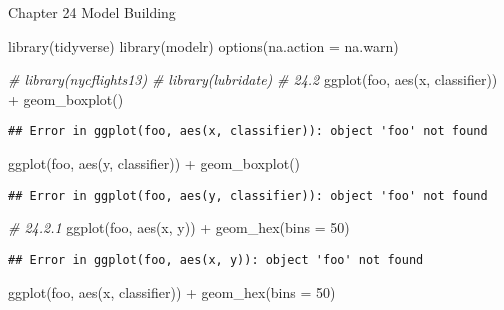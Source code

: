 \documentclass[
]{article}
\newenvironment{Shaded}{\begin{snugshade}}{\end{snugshade}}
\newcommand{\AttributeTok}[1]{\textcolor[rgb]{0.77,0.63,0.00}{#1}}
\newcommand{\CommentTok}[1]{\textcolor[rgb]{0.56,0.35,0.01}{\textit{#1}}}
\newcommand{\DecValTok}[1]{\textcolor[rgb]{0.00,0.00,0.81}{#1}}
\newcommand{\FunctionTok}[1]{\textcolor[rgb]{0.00,0.00,0.00}{#1}}
\newcommand{\NormalTok}[1]{#1}
\newcommand{\SpecialCharTok}[1]{\textcolor[rgb]{0.00,0.00,0.00}{#1}}
\begin{document}
Chapter 24 Model Building

\begin{Shaded}
\begin{Highlighting}[]
\FunctionTok{library}\NormalTok{(tidyverse)}
\FunctionTok{library}\NormalTok{(modelr)}
\FunctionTok{options}\NormalTok{(}\AttributeTok{na.action =}\NormalTok{ na.warn)}

\CommentTok{\# library(nycflights13)}
\CommentTok{\# library(lubridate)}
\CommentTok{\# 24.2}
\FunctionTok{ggplot}\NormalTok{(foo, }\FunctionTok{aes}\NormalTok{(x, classifier)) }\SpecialCharTok{+} \FunctionTok{geom\_boxplot}\NormalTok{()}
\end{Highlighting}
\end{Shaded}

\begin{verbatim}
## Error in ggplot(foo, aes(x, classifier)): object 'foo' not found
\end{verbatim}

\begin{Shaded}
\begin{Highlighting}[]
\FunctionTok{ggplot}\NormalTok{(foo, }\FunctionTok{aes}\NormalTok{(y, classifier)) }\SpecialCharTok{+} \FunctionTok{geom\_boxplot}\NormalTok{()}
\end{Highlighting}
\end{Shaded}

\begin{verbatim}
## Error in ggplot(foo, aes(y, classifier)): object 'foo' not found
\end{verbatim}

\begin{Shaded}
\begin{Highlighting}[]
\CommentTok{\# 24.2.1}
\FunctionTok{ggplot}\NormalTok{(foo, }\FunctionTok{aes}\NormalTok{(x, y)) }\SpecialCharTok{+} 
  \FunctionTok{geom\_hex}\NormalTok{(}\AttributeTok{bins =} \DecValTok{50}\NormalTok{)}
\end{Highlighting}
\end{Shaded}

\begin{verbatim}
## Error in ggplot(foo, aes(x, y)): object 'foo' not found
\end{verbatim}

\begin{Shaded}
\begin{Highlighting}[]
\FunctionTok{ggplot}\NormalTok{(foo, }\FunctionTok{aes}\NormalTok{(x, classifier)) }\SpecialCharTok{+} 
  \FunctionTok{geom\_hex}\NormalTok{(}\AttributeTok{bins =} \DecValTok{50}\NormalTok{)}
\end{Highlighting}
\end{Shaded}
\end{document}
